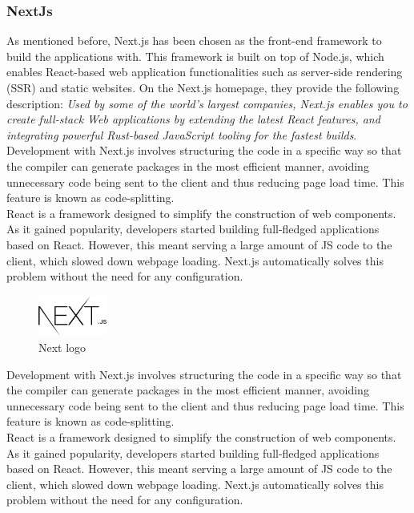 \documentclass[../memory.tex]{subfiles}
\begin{document}
\subsubsection{NextJs}
As mentioned before, Next.js has been chosen as the front-end framework to build
the applications with. This framework is built on top of Node.js, which enables
React-based web application functionalities such as server-side rendering (SSR)
and static websites. On the Next.js homepage, they provide the following
description: \emph{Used by some of the world's largest companies, Next.js
	enables you to create full-stack Web applications by extending the latest React
	features, and integrating powerful Rust-based JavaScript tooling for the fastest
	builds}.
\\[8pt]
Development with Next.js involves structuring the code in a specific way so
that the compiler can generate packages in the most efficient manner,
avoiding unnecessary code being sent to the client and thus reducing page
load time. This feature is known as code-splitting.
\\
React is a framework designed to simplify the construction of web components. As
it gained popularity, developers started building full-fledged applications
based on React. However, this meant serving a large amount of JS code to the
client, which slowed down webpage loading. Next.js automatically solves this
problem without the need for any configuration.
\begin{figure}[H]
	\centering
	\includegraphics[width=0.2\textwidth]{./assets/logos/next-logo.png}
	\caption{Next logo}
\end{figure}
Development with Next.js involves structuring the code in a specific way so that
the compiler can generate packages in the most efficient manner, avoiding
unnecessary code being sent to the client and thus reducing page load time. This
feature is known as code-splitting.
\\
React is a framework designed to simplify the construction of web components. As
it gained popularity, developers started building full-fledged applications
based on React. However, this meant serving a large amount of JS code to the
client, which slowed down webpage loading. Next.js automatically solves this
problem without the need for any configuration.
\end{document}
